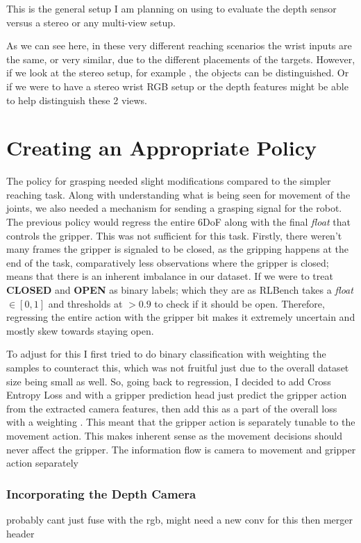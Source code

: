 
This is the general setup I am planning on using to evaluate the depth sensor versus a stereo or any multi-view setup.

As we can see here, in these very different reaching scenarios  the wrist inputs are the same, or very similar, due to the different placements of the targets. However, if we look at the stereo setup, for example , the objects can be distinguished. Or if we were to have a stereo wrist RGB setup  or  the depth features might be able to help distinguish these 2 views.

\section{Creating an Appropriate Policy}
The policy for grasping needed slight modifications compared to the simpler reaching task. Along with understanding what is being seen for movement of the joints, we also needed a mechanism for sending a grasping signal for the robot. The previous policy would regress the entire 6DoF along with the final \emph{float} that controls the gripper. This was not sufficient for this task. Firstly, there weren't many frames the gripper is signaled to be closed, as the gripping happens at the end of the task, comparatively less observations where the gripper is closed; means that there is an inherent imbalance in our dataset. If we were to treat \textbf{CLOSED} and \textbf{OPEN} as binary labels; which they are as RLBench takes a \emph{float} $\in \left[0, 1\right]$ and thresholds at $ > 0.9$ to check if it should be open. Therefore, regressing the entire action with the gripper bit makes it extremely uncertain and mostly skew towards staying open. 

To adjust for this I first tried to do binary classification with weighting the samples to counteract this, which was not fruitful just due to the overall dataset size being small as well. So, going back to regression, I decided to add Cross Entropy Loss and with a gripper prediction head just predict the gripper action from the extracted camera features, then add this as a part of the overall loss with a weighting . This meant that the gripper action is separately tunable to the movement action. This makes inherent sense as the movement decisions should never affect the gripper. The information flow is camera to movement and gripper action separately  


\subsubsection{Incorporating the Depth Camera}
probably cant just fuse with the rgb, might need a new conv for this then merger header


